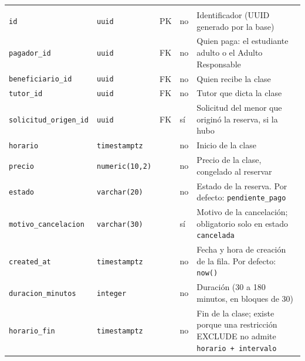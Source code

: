 {\small
\begin{xltabular}{\textwidth}{@{}>{\raggedright\arraybackslash}p{3.6cm} >{\raggedright\arraybackslash}p{2.3cm} >{\raggedright\arraybackslash}p{1cm} >{\centering\arraybackslash}p{0.85cm} L@{}}
    \toprule
     &  &  &  &  \\
    \midrule
    \endfirsthead
    \toprule
     &  &  &  &  \\
    \midrule
    \endhead
    \bottomrule
    \endfoot
    \texttt{id} & \texttt{uuid} & PK & no & Identificador (UUID generado por la base) \\
    \texttt{pagador\_\allowbreak{}id} & \texttt{uuid} & FK & no & Quien paga: el estudiante adulto o el Adulto Responsable \\
    \texttt{beneficiario\_\allowbreak{}id} & \texttt{uuid} & FK & no & Quien recibe la clase \\
    \texttt{tutor\_\allowbreak{}id} & \texttt{uuid} & FK & no & Tutor que dicta la clase \\
    \texttt{solicitud\_\allowbreak{}origen\_\allowbreak{}id} & \texttt{uuid} & FK & sí & Solicitud del menor que originó la reserva, si la hubo \\
    \texttt{horario} & \texttt{timestamptz} &  & no & Inicio de la clase \\
    \texttt{precio} & \texttt{numeric(\allowbreak{}10,\allowbreak{}2)} &  & no & Precio de la clase, congelado al reservar \\
    \texttt{estado} & \texttt{varchar(\allowbreak{}20)} &  & no & Estado de la reserva. Por defecto: \texttt{\textquotesingle{}pendiente\_\allowbreak{}pago\textquotesingle{}} \\
    \texttt{motivo\_\allowbreak{}cancelacion} & \texttt{varchar(\allowbreak{}30)} &  & sí & Motivo de la cancelación; obligatorio solo en estado \texttt{cancelada} \\
    \texttt{created\_\allowbreak{}at} & \texttt{timestamptz} &  & no & Fecha y hora de creación de la fila. Por defecto: \texttt{now(\allowbreak{})} \\
    \texttt{duracion\_\allowbreak{}minutos} & \texttt{integer} &  & no & Duración (30 a 180 minutos, en bloques de 30) \\
    \texttt{horario\_\allowbreak{}fin} & \texttt{timestamptz} &  & no & Fin de la clase; existe porque una restricción EXCLUDE no admite \texttt{horario + intervalo} \\

\end{xltabular}}
